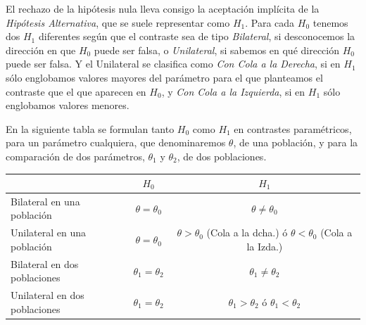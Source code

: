 El rechazo de la hipótesis nula lleva consigo la aceptación implícita de la \emph{Hipótesis Alternativa}, que se suele
representar como $H_1$. Para cada $H_0$ tenemos dos $H_1$ diferentes según que el contraste sea de tipo
\emph{Bilateral}, si desconocemos la dirección en que $H_0$ puede ser falsa, o \emph{Unilateral}, si sabemos en qué
dirección $H_0$ puede ser falsa. Y el Unilateral se clasifica como \emph{Con Cola a la Derecha}, si en $H_1$ sólo
englobamos valores mayores del parámetro para el que planteamos el contraste que el que aparecen en $H_0$, y \emph{Con
Cola a la Izquierda}, si en $H_1$ sólo englobamos valores menores.

En la siguiente tabla se formulan tanto $H_0$ como $H_1$ en contrastes paramétricos, para un parámetro cualquiera, que
denominaremos $\theta$, de una población, y para la comparación de dos parámetros, $\theta_1$ y $\theta_2$, de dos
poblaciones.

\begin{center}
\begin{tabular}{|l|l|l|}
\cline{2-3}
\multicolumn{1}{l|}{} & \multicolumn{1}{c|}{$H_0$} & \multicolumn{1}{c|}{$H_1$} \\
\hline
Bilateral en una población & \multicolumn{1}{c|}{$\theta=\theta_0$} & \multicolumn{1}{c|}{$\theta\neq{\theta_0}$} \\
\hline
Unilateral en una población & \multicolumn{1}{c|}{$\theta=\theta_0$} & \multicolumn{1}{c|}{$\theta>\theta_0$ (Cola a la dcha.) ó $\theta<\theta_0$ (Cola a la Izda.)} \\
\hline
Bilateral en dos poblaciones & \multicolumn{1}{c|}{$\theta_1=\theta_2$} & \multicolumn{1}{c|}{$\theta_1\neq{\theta_2}$} \\
\hline
Unilateral en dos poblaciones & \multicolumn{1}{c|}{$\theta_1=\theta_2$} & \multicolumn{1}{c|}{$\theta_1>\theta_2$ ó $\theta_1<\theta_2$} \\
\hline
\end{tabular}
\end{center}

